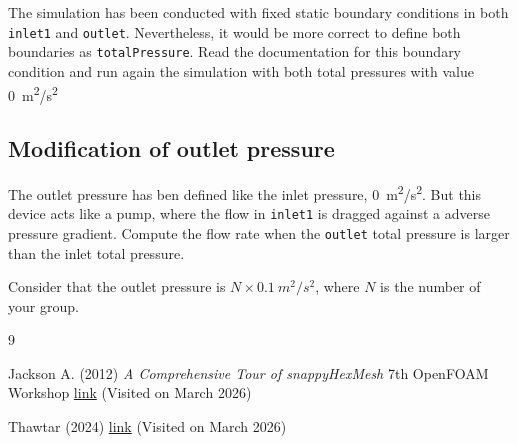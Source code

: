 \documentclass[
parskip=half,      %
DIV=12,            %
headings=normal,   %
fontsize=11pt,     %
english            %
]{scrartcl}
\begin{document}
	The simulation has been conducted with fixed static boundary conditions in both \texttt{inlet1}
	and \texttt{outlet}. Nevertheless, it would be more correct to define both boundaries
	as \texttt{totalPressure}. Read the documentation for this boundary condition and 
	run again the simulation with both total pressures with value \qty{0}{m^2/s^2}
	
	\subsection{Modification of outlet pressure}
	
	The outlet pressure has ben defined like the inlet pressure, \qty{0}{m^2/s^2}. But
	this device acts like a pump, where the flow in \texttt{inlet1} is dragged against a
	adverse pressure gradient. Compute the flow rate when the \texttt{outlet} total pressure
	is larger than the inlet total pressure. 
	
	Consider that the outlet pressure is 
	$N\times \qty{0.1}{m^2/s^2}$, where $N$ is the number of your group.	
	
	\begin{thebibliography}{9}
		
	Jackson A. (2012) \textit{A Comprehensive Tour of snappyHexMesh} 7th OpenFOAM Workshop
	\href{https://openfoamwiki.net/images/f/f0/Final-AndrewJacksonSlidesOFW7.pdf}{link} (Visited on March 2026)
	
	Thawtar (2024)	
	\href{https://cfdmonkey.com/tips-and-tricks-for-significantly-improving-your-snappyhexmesh/}
	{link}
	(Visited on March 2026)
	
	\end{thebibliography}
\end{document}
